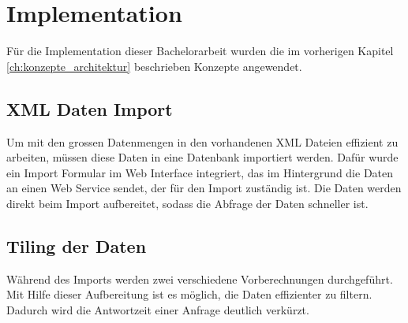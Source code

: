 \chapter{Implementation}
Für die Implementation dieser Bachelorarbeit wurden die im vorherigen Kapitel \ref{ch:konzepte_architektur}  beschrieben Konzepte angewendet.
\section{XML Daten Import}
Um mit den grossen Datenmengen in den vorhandenen XML Dateien effizient zu arbeiten, müssen diese Daten in eine Datenbank importiert werden. Dafür wurde ein Import Formular im Web Interface integriert, das im Hintergrund die Daten an einen Web Service sendet, der für den Import zuständig ist. Die Daten werden direkt beim Import aufbereitet, sodass die Abfrage der Daten schneller ist.
\section{Tiling der Daten}
\label{sec:tilingdataimplementation}
Während des Imports werden zwei verschiedene Vorberechnungen durchgeführt. Mit Hilfe dieser Aufbereitung ist es möglich, die Daten effizienter zu filtern. Dadurch wird die Antwortzeit einer Anfrage deutlich verkürzt.
